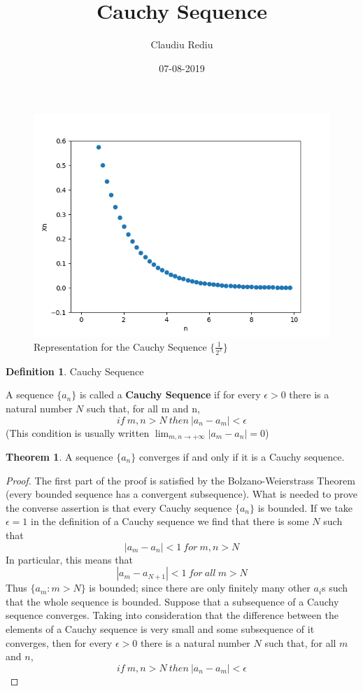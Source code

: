 \documentclass[11pt, a4paper]{article}
\title{{\myfont Cauchy Sequence}}
\date{07-08-2019}
\author{Claudiu Rediu}
\theoremstyle{definition}
\newtheorem*{definition}{Definition} %
\theoremstyle{theorem}
\newtheorem{theorem}{Theorem}
\begin{document}
	\maketitle
	\newpage
	\newpage
	\begin{figure}[h]
		\includegraphics[width = \linewidth]{graph.png}
		\caption{Representation for the Cauchy Sequence $\{\frac{1}{2^x}\}$ }
	\end{figure}
	\begin{definition}{Cauchy Sequence}
		
		A sequence $\{a_n\}$ is called a \textbf{Cauchy Sequence} if for every $\epsilon > 0 $ there is a natural number $N$ such that, for all m and n, 
		$$ if \ m, n > N \ then \ |a_n - a_m| < \epsilon $$
		(This condition is usually written $\lim_{m,n \to +\infty} |a_m - a_n| = 0 $)
	\end{definition}
	
	\begin{theorem}
		A sequence $\{a_n\}$ converges if and only if it is a Cauchy sequence.
	\end{theorem}

	\begin{proof}
		The first part of the proof is satisfied by the Bolzano-Weierstrass Theorem (every bounded sequence has a convergent subsequence). What is needed to prove the converse assertion is that every Cauchy sequence $\{a_n\}$ is bounded.
		If we take $\epsilon = 1$ in the definition of a Cauchy sequence we find that there is some $N$ such that
		$$|a_m - a_n| < 1 \ for \ m,n > N $$
		In particular, this means that
		$$ |a_m - a_{N+1}| < 1 \ for \  all \ m > N$$
		Thus $\{a_m : m > N\}$ is bounded; since there are only finitely many other $a_i$s such that the whole sequence is bounded.
		Suppose that a subsequence of a Cauchy sequence converges. Taking into consideration that the difference between the elements of a Cauchy sequence is very small and some subsequence of it converges, then for every $\epsilon > 0$ there is a natural number $N$ such that, for all $m$ and $n$,
		$$ if \ m, n > N \ then \ |a_n - a_m| < \epsilon $$
	\end{proof}

	
\end{document}
